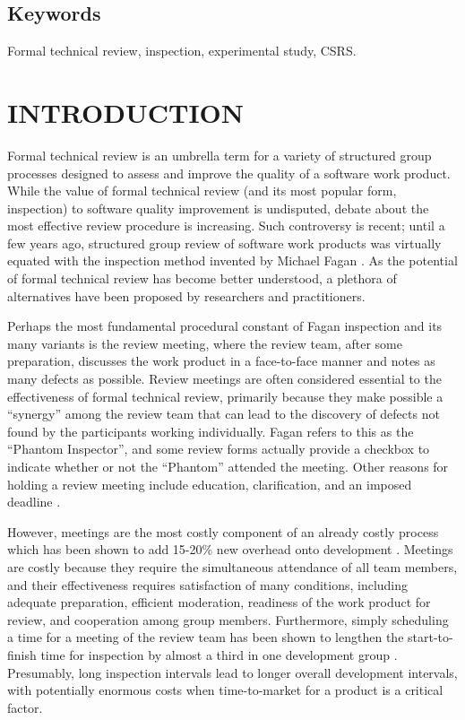 \subsection{Keywords}
Formal technical review, inspection, experimental study, CSRS.

\section{INTRODUCTION}

Formal technical review is an umbrella term for a variety of structured
group processes designed to assess and improve the quality of a software
work product.  While the value of formal technical review (and its most
popular form, inspection) to software quality improvement is undisputed,
debate about the most effective review procedure is increasing.  Such
controversy is recent; until a few years ago, structured group review of
software work products was virtually equated with the inspection method
invented by Michael Fagan \cite{Fagan76,Fagan86}.  As the potential of
formal technical review has become better understood, a plethora of
alternatives have been proposed by researchers and practitioners.

Perhaps the most fundamental procedural constant of Fagan inspection and
its many variants is the review meeting, where the review team, after some
preparation, discusses the work product in a face-to-face manner and notes
as many defects as possible.  Review meetings are often considered
essential to the effectiveness of formal technical review, primarily
because they make possible a ``synergy'' among the review team that can
lead to the discovery of defects not found by the participants working
individually.  Fagan refers to this as the ``Phantom Inspector'', and some
review forms actually provide a checkbox to indicate whether or not the
``Phantom'' attended the meeting.  Other reasons for holding a review
meeting include education, clarification, and an imposed deadline
\cite{Gilb93}.

However, meetings are the most costly component of an already costly
process which has been shown to add 15-20\% new overhead onto development
\cite{Russell91}. Meetings are costly because they require the simultaneous
attendance of all team members, and their effectiveness requires
satisfaction of many conditions, including adequate preparation, efficient
moderation, readiness of the work product for review, and cooperation among
group members.  Furthermore, simply scheduling a time for a meeting of the
review team has been shown to lengthen the start-to-finish time for
inspection by almost a third in one development group \cite{Votta93}.
Presumably, long inspection intervals lead to longer overall development
intervals, with potentially enormous costs when time-to-market for a
product is a critical factor.

